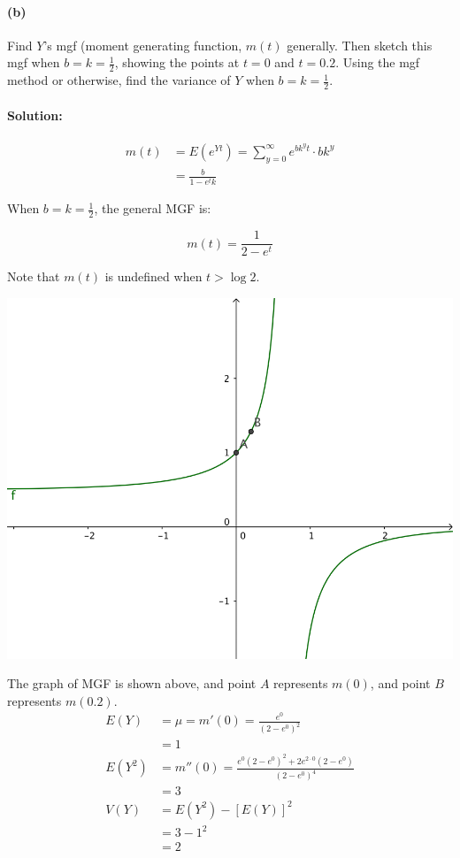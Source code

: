 \documentclass[a4paper, 11pt, twoside]{article}
\begin{document}
\paragraph{(b)} Find $Y$'s mgf (moment generating function, $m(t)$ generally. Then sketch this mgf when $b=k=\frac{1}{2}$, showing the points at $t=0$ and $t=0.2$. Using the mgf method or otherwise, find the variance of $Y$ when $b=k=\frac{1}{2}$.

\paragraph{Solution:} 

\[\begin{split}
	m(t)&=E(e^{Yt})=\sum^\infty_{y=0}e^{bk^yt}\cdot bk^y\\
	&=\frac{b}{1-e^tk}
\end{split}
\]

When $b=k=\frac{1}{2}$, the general MGF is: 

\[m(t)=\frac{1}{2-e^t}\]

Note that $m(t)$ is undefined when $t>\log{2}$.

\includegraphics{image/3b-mgf}

The graph of MGF is shown above, and point $A$ represents $m(0)$, and point $B$ represents $m(0.2)$.\\

\[
\begin{split}
	E(Y)&=\mu=m'(0)=\frac{e^0}{(2-e^0)^2}\\
	&= 1\\
	E(Y^2)&=m''(0)=\frac{e^0(2-e^0)^2+2e^{2\cdot 0}(2-e^0)}{(2-e^0)^4}\\
	&=3\\
	V(Y)&=E(Y^2)-[E(Y)]^2\\
	&=3-1^2\\
	&=2
\end{split}
\]
\end{document}
